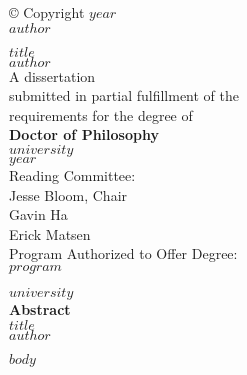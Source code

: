 \documentclass{report}
\begin{document}
\thispagestyle{empty}
\vspace*{\fill}
\begin{center}
© Copyright $year$ \\
$author$
\end{center}
\vspace*{\fill}
\newpage

\thispagestyle{empty}
\vspace*{\fill}
\begin{center}
\huge{$title$} \\
\vspace{1cm}
\Large{$author$} \\
\vspace{1cm}
A dissertation \\
submitted in partial fulfillment of the \\
requirements for the degree of \\
\vspace{1cm}
\textbf{Doctor of Philosophy} \\
\vspace{1cm}
$university$ \\
$year$ \\
\vspace{1cm}
Reading Committee: \\
Jesse Bloom, Chair \\
Gavin Ha \\
Erick Matsen \\
\vspace{1cm}
Program Authorized to Offer Degree: \\
$program$
\end{center}
\vspace*{\fill}
\newpage

\thispagestyle{empty}
\vspace*{\fill}
\begin{center}
$university$ \\
\vspace{1cm}
\textbf{Abstract} \\
\vspace{1cm}
\huge{$title$} \\
\vspace{1cm}
\Large{$author$}
\end{center}
\vspace*{\fill}
\newpage

$body$



\end{document}
